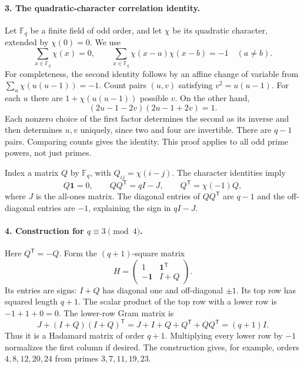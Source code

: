 \documentclass[11pt]{article}
\begin{document}
\paragraph{3. The quadratic-character correlation identity.}
Let $\mathbb F_q$ be a finite field of odd order, and let $\chi$ be its quadratic character, extended by $\chi(0)=0$. We use
\[
 \sum_{x\in\mathbb F_q}\chi(x)=0,\qquad
 \sum_{x\in\mathbb F_q}\chi(x-a)\chi(x-b)=-1\quad(a\ne b).
\]
For completeness, the second identity follows by an affine change of variable from $\sum_u\chi(u(u-1))=-1$. Count pairs $(u,v)$ satisfying $v^2=u(u-1)$. For each $u$ there are $1+\chi(u(u-1))$ possible $v$. On the other hand,
\[
 (2u-1-2v)(2u-1+2v)=1.
\]
Each nonzero choice of the first factor determines the second as its inverse and then determines $u,v$ uniquely, since two and four are invertible. There are $q-1$ pairs. Comparing counts gives the identity. This proof applies to all odd prime powers, not just primes.

Index a matrix $Q$ by $\mathbb F_q$, with $Q_{ij}=\chi(i-j)$. The character identities imply
\[
 Q\mathbf1=0,\qquad QQ^{\mathsf T}=qI-J,
 \qquad Q^{\mathsf T}=\chi(-1)Q,
\]
where $J$ is the all-ones matrix. The diagonal entries of $QQ^{\mathsf T}$ are $q-1$ and the off-diagonal entries are $-1$, explaining the sign in $qI-J$.

\paragraph{4. Construction for $q\equiv3\pmod4$.}
Here $Q^{\mathsf T}=-Q$. Form the $(q+1)$-square matrix
\[
 H=\begin{pmatrix}1&\mathbf1^{\mathsf T}\\
 -\mathbf1&I+Q\end{pmatrix}.
\]
Its entries are signs: $I+Q$ has diagonal one and off-diagonal $\pm1$. Its top row has squared length $q+1$. The scalar product of the top row with a lower row is $-1+1+0=0$. The lower-row Gram matrix is
\[
 J+(I+Q)(I+Q)^{\mathsf T}
 =J+I+Q+Q^{\mathsf T}+QQ^{\mathsf T}=(q+1)I.
\]
Thus it is a Hadamard matrix of order $q+1$. Multiplying every lower row by $-1$ normalizes the first column if desired. The construction gives, for example, orders $4,8,12,20,24$ from primes $3,7,11,19,23$.
\end{document}
